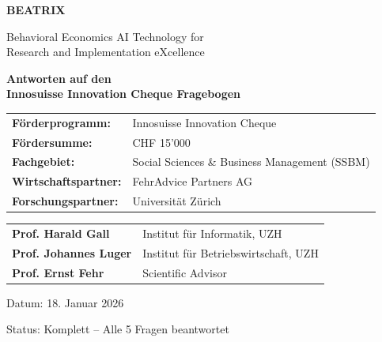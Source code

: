 \documentclass[11pt,a4paper]{article}
\begin{document}
\begin{titlepage}
    \centering
    \vspace*{2cm}

    {\Huge\bfseries\color{innosuisse} BEATRIX\par}
    \vspace{0.5cm}
    {\Large Behavioral Economics AI Technology for\\Research and Implementation eXcellence\par}

    \vspace{2cm}

    {\LARGE\bfseries Antworten auf den\\Innosuisse Innovation Cheque Fragebogen\par}

    \vspace{1.5cm}

    \begin{tabular}{ll}
        \textbf{Förderprogramm:} & Innosuisse Innovation Cheque \\
        \textbf{Fördersumme:} & CHF 15'000 \\
        \textbf{Fachgebiet:} & Social Sciences \& Business Management (SSBM) \\
        \textbf{Wirtschaftspartner:} & FehrAdvice Partners AG \\
        \textbf{Forschungspartner:} & Universität Zürich \\
    \end{tabular}

    \vspace{2cm}

    \begin{tabular}{ll}
        \textbf{Prof. Harald Gall} & Institut für Informatik, UZH \\
        \textbf{Prof. Johannes Luger} & Institut für Betriebswirtschaft, UZH \\
        \textbf{Prof. Ernst Fehr} & Scientific Advisor \\
    \end{tabular}

    \vfill

    {\large Datum: 18. Januar 2026\par}
    {\large Status: Komplett -- Alle 5 Fragen beantwortet\par}
\end{titlepage}

\tableofcontents
\newpage
\end{document}
